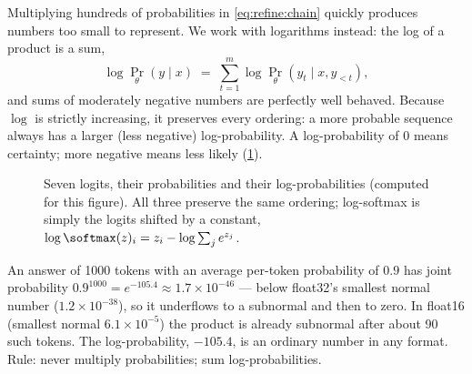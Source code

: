 Multiplying hundreds of probabilities in \cref{eq:refine:chain} quickly produces numbers too small to
represent. We work with logarithms instead: the log of a product is a sum,
\begin{equation}
  \log \Pr_\theta(y \mid x) \;=\; \sum_{t=1}^{m} \log \Pr_\theta(y_t \mid x, y_{<t}),
\end{equation}
and sums of moderately negative numbers are perfectly well behaved. Because $\log$ is strictly
increasing, it preserves every ordering: a more probable sequence always has a larger (less
negative) log-probability. A log-probability of $0$ means certainty; more negative means less likely
(\cref{fig:refine:three-views}).

\begin{figure}[t]
\centering
{}
\caption{Seven logits, their probabilities and their log-probabilities (computed for this figure).
All three preserve the same ordering; log-softmax is simply the logits shifted by a constant,
$\log\softmax(z)_i = z_i - \log\sum_j e^{z_j}$.}
\label{fig:refine:three-views}
\end{figure}

\begin{napkinmath}
An answer of 1000 tokens with an average per-token probability of $0.9$ has joint probability
$0.9^{1000} = e^{-105.4} \approx 1.7\times10^{-46}$ --- below float32's smallest normal number
($1.2\times10^{-38}$), so it underflows to a subnormal and then to zero. In float16 (smallest normal
$6.1\times10^{-5}$) the product is already subnormal after about 90 such tokens. The log-probability,
$-105.4$, is an ordinary number in any format. Rule: never multiply probabilities; sum
log-probabilities.
\end{napkinmath}

